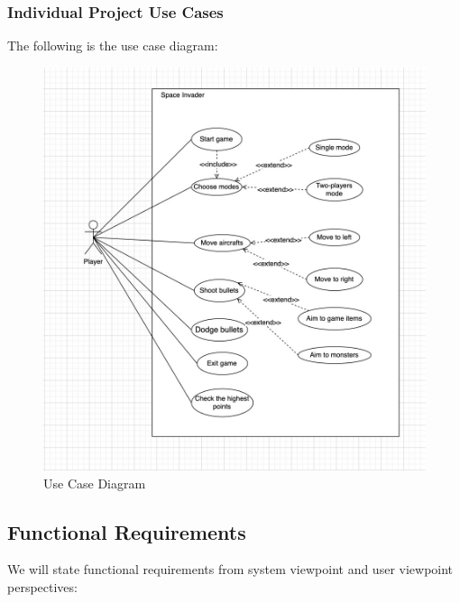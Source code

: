 \documentclass[12pt]{article}
\begin{document}
\subsubsection{Individual Project Use Cases}
The following is the use case diagram:
\begin{figure}[h!]
\begin{center}
\includegraphics[scale=1]{Use_Case.png}
\end{center}
\caption{Use Case Diagram}
\end{figure}
\newpage
\subsection{Functional Requirements}
We will state functional requirements from system viewpoint
and user viewpoint perspectives:
\end{document}
